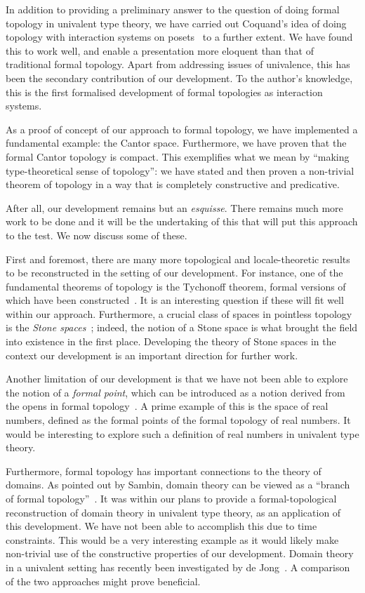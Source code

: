 In addition to providing a preliminary answer to the question of doing formal topology in
univalent type theory, we have carried out Coquand's idea of doing topology with
interaction systems on posets~\cite{coq-posets} to a further extent. We have found this to
work well, and enable a presentation more eloquent than that of traditional formal
topology. Apart from addressing issues of univalence, this has been the secondary
contribution of our development. To the author's knowledge, this is the first formalised
development of formal topologies as interaction systems.

As a proof of concept of our approach to formal topology, we have implemented a
fundamental example: the Cantor space. Furthermore, we have proven that the formal Cantor
topology is compact. This exemplifies what we mean by ``making type-theoretical sense of
topology'': we have stated and then proven a non-trivial theorem of topology in a way that
is completely constructive and predicative.

After all, our development remains but an \emph{esquisse}. There remains much more work to
be done and it will be the undertaking of this that will put this approach to the test. We
now discuss some of these.

First and foremost, there are many more topological and locale-theoretic results to be
reconstructed in the setting of our development. For instance, one of the fundamental
theorems of topology is the Tychonoff theorem, formal versions of which have been
constructed~\cite{coq-tychonoff}. It is an interesting question if these will fit well
within our approach. Furthermore, a crucial class of spaces in pointless topology is the
\emph{Stone spaces}~\cite{stone-spaces}; indeed, the notion of a Stone space is what
brought the field into existence in the first place. Developing the theory of Stone spaces
in the context our development is an important direction for further work.

Another limitation of our development is that we have not been able to explore the notion
of a \emph{formal point}, which can be introduced as a notion derived from the opens in
formal topology~\cite[pg.~94]{coq-sambin}. A prime example of this is the space of real
numbers, defined as the formal points of the formal topology of real numbers. It would be
interesting to explore such a definition of real numbers in univalent type theory.

Furthermore, formal topology has important connections to the theory of domains. As
pointed out by Sambin, domain theory can be viewed as a ``branch of formal
topology''~\cite{sambin-domains}. It was within our plans to provide a formal-topological
reconstruction of domain theory in univalent type theory, as an application of this
development. We have not been able to accomplish this due to time constraints. This would
be a very interesting example as it would likely make non-trivial use of the constructive
properties of our development. Domain theory in a univalent setting has recently been
investigated by de Jong~\cite{de-jong-domains}. A comparison of the two approaches might
prove beneficial.

